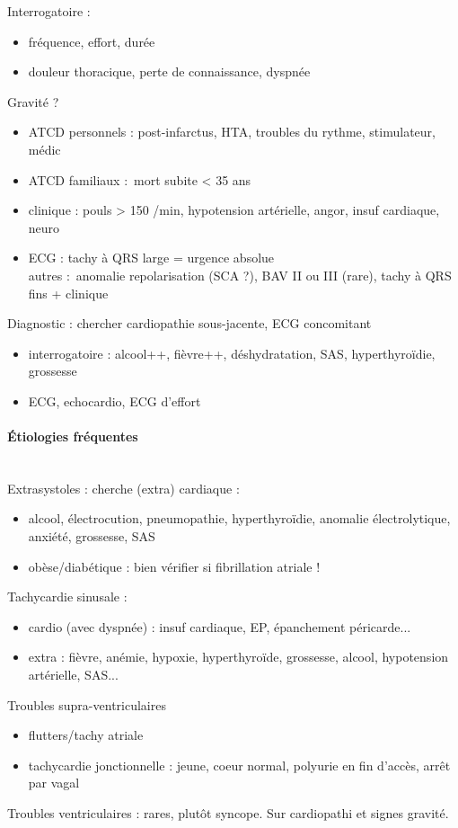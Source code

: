 Interrogatoire : 
\begin{itemize}
  \item fréquence, effort, durée
  \item \danger{} douleur thoracique, perte de connaissance, dyspnée
\end{itemize}
Gravité ?
\begin{itemize}
  \item ATCD personnels : post-infarctus, HTA, troubles du rythme, stimulateur,
    médic
  \item ATCD familiaux : mort subite < 35 ans
  \item clinique : pouls > 150 /min, hypotension artérielle, angor, insuf
    cardiaque, neuro
  \item ECG : tachy à QRS large = urgence absolue \skull\\
    autres : anomalie repolarisation (SCA ?), BAV II ou III (rare), tachy à QRS
    fins + clinique
\end{itemize}
Diagnostic : chercher cardiopathie sous-jacente, ECG concomitant
\begin{itemize}
  \item interrogatoire : alcool++, fièvre++, déshydratation, SAS,
    hyperthyroïdie, grossesse
  \item ECG, echocardio, ECG d'effort
\end{itemize}

\paragraph{Étiologies fréquentes}\mbox{}\\
Extrasystoles : cherche (extra) cardiaque :
\begin{itemize}
  \item alcool, électrocution, pneumopathie, hyperthyroïdie, anomalie
    électrolytique, anxiété, grossesse, SAS
  \item \danger{} obèse/diabétique : bien vérifier si fibrillation atriale !
\end{itemize}
Tachycardie sinusale :
\begin{itemize}
  \item cardio (avec dyspnée) : insuf cardiaque, EP, épanchement péricarde...
  \item extra : fièvre, anémie, hypoxie, hyperthyroïde, grossesse, alcool,
    hypotension artérielle, SAS...
\end{itemize}
Troubles supra-ventriculaires
\begin{itemize}
  \item flutters/tachy atriale
  \item tachycardie jonctionnelle : jeune, coeur normal, polyurie en fin d'accès,
    arrêt par vagal
\end{itemize}
Troubles ventriculaires : rares, plutôt syncope. Sur cardiopathi et signes
gravité.

